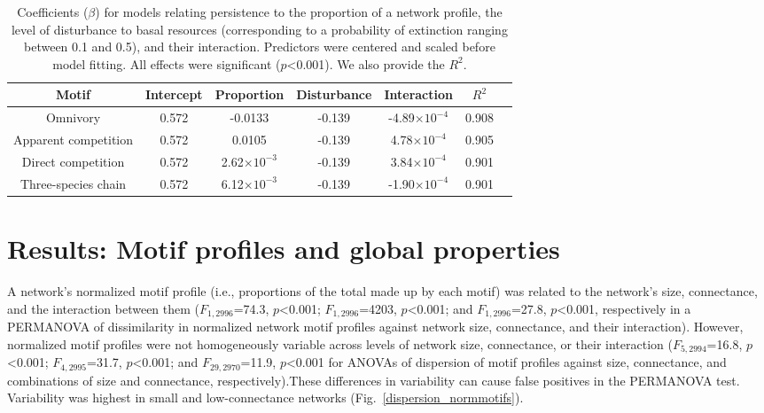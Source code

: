 \documentclass[12pt]{article}
\begin{document}
\begin{spacing}{2.0}
    
    \begin{table}[h!]
        \caption{Coefficients ($\beta$) for models relating persistence to the proportion of a network profile, the level of disturbance to basal resources (corresponding to a probability of extinction ranging between 0.1 and 0.5), and their interaction. Predictors were centered and scaled before model fitting. All effects were significant ($p$\textless0.001). We also provide the $R^2$. }
        \label{motif_profile_tab}
        \centering
        \begin{tabular}{c|c c c c c | c}
            Motif & Intercept & Proportion & Disturbance & Interaction & $R^2$\\
            \hline
            Omnivory & 0.572 & -0.0133 & -0.139 & -4.89$\times10^{-4}$ & 0.908 \\
            Apparent competition & 0.572 & 0.0105 & -0.139 & 4.78$\times10^{-4}$ & 0.905 \\
            Direct competition & 0.572 & 2.62$\times10^{-3}$ & -0.139 & 3.84$\times10^{-4}$ & 0.901 \\
            Three-species chain & 0.572 & 6.12$\times10^{-3}$ & -0.139 & -1.90$\times10^{-4}$ & 0.901 \\ 
        \end{tabular}
    \end{table}
\clearpage


\section{Results: Motif profiles and global properties}


    A network's normalized motif profile (i.e., proportions of the total made up by each motif) was related to the network's size, connectance, and the interaction between them ($F_{1,2996}$=74.3, $p$\textless0.001; $F_{1,2996}$=4203, $p$\textless0.001; and $F_{1,2996}$=27.8, $p$\textless0.001, respectively in a PERMANOVA of dissimilarity in normalized network motif profiles against network size, connectance, and their interaction).
    However, normalized motif profiles were not homogeneously variable across levels of network size, connectance, or their interaction  ($F_{5,2994}$=16.8, $p$\textless0.001; $F_{4,2995}$=31.7, $p$\textless0.001; and $F_{29,2970}$=11.9, $p$\textless0.001 for ANOVAs of dispersion of motif profiles against size, connectance, and combinations of size and connectance, respectively).These differences in variability can cause false positives in the PERMANOVA test. Variability was highest in small and low-connectance networks (Fig.~\ref{dispersion_normmotifs}).



\end{spacing}
\end{document}
